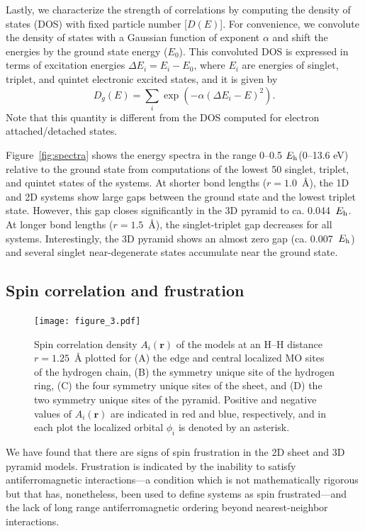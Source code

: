 \documentclass[aip,jcp,amsmath,amssymb, reprint]{revtex4-1}
\newcommand*{\Eh}{$E_{\rm h}$\xspace}
\begin{document}
Lastly, we characterize the strength of correlations by computing the density of states (DOS) with fixed particle number [$D(E)$].
For convenience, we convolute the density of states with a Gaussian function of exponent $\alpha$ and shift the energies by the ground state energy ($E_0$).
This convoluted DOS is expressed in terms of excitation energies  $\Delta E_i = E_i- E_0 $, where $E_i$ are energies of singlet, triplet, and quintet electronic excited states, and it is given by
\begin{equation}
\label{eq:dos}
D_g(E) = \sum_i \exp(-\alpha (\Delta E_i - E)^2).
\end{equation}
Note that this quantity is different from the DOS computed for electron attached/detached states.

Figure~\ref{fig:spectra} shows the energy spectra in the range 0--0.5 \Eh (0--13.6 eV) relative to the ground state from computations of the lowest 50 singlet, triplet, and quintet states of the  systems. At shorter bond lengths ($r = 1.0$~{\AA}), the 1D and 2D systems show large gaps between the ground state and the lowest triplet state.
However, this gap closes significantly in the 3D pyramid to ca.  0.044~\Eh.
At longer bond lengths ($r = 1.5$~{\AA}), the singlet-triplet gap decreases for all systems. Interestingly, the 3D pyramid shows an almost zero gap (ca. 0.007~\Eh) and several singlet near-degenerate states accumulate near the ground state.

\subsection{\label{sec:spin_correlation}Spin correlation and frustration}

\begin{figure}[tbh]
\centering
\texttt{[image: figure\_3.pdf]}
\caption{Spin correlation density $A_{i}(\mathbf{r})$ of the  models at an H--H distance $r=1.25$~{\AA} plotted for (A) the edge and central localized MO sites of the hydrogen chain, (B) the symmetry unique site of the hydrogen ring, (C) the four symmetry unique sites of the  sheet, and (D) the two symmetry unique sites of the  pyramid. Positive and negative values of $A_{i}(\mathbf{r})$ are indicated in red and blue, respectively, and in each plot the localized orbital $\phi_i$ is denoted by an asterisk.}
\label{fig:spin_correlation}
\end{figure} 

We have found that there are signs of spin frustration in the 2D sheet and 3D pyramid models.
Frustration is indicated by the inability to satisfy antiferromagnetic interactions---a condition which is not mathematically rigorous but that has, nonetheless, been used to define systems as spin frustrated\cite{Baker2012ClassificationOf}---and the lack of long range antiferromagnetic ordering beyond nearest-neighbor interactions.
 
\end{document}
